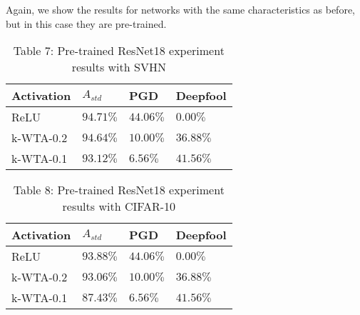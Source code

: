 \documentclass[a4paper]{article}
\begin{document}
	Again, we show the results for networks with the same characteristics as before, but in this case they are pre-trained.
	\begin{table}[!htbp]
		\begin{tabular}{|p{}|p{}|p{}|p{}|}
			\hline
			Activation	& $A_{std}$	&	PGD	&	Deepfool	\\
			\hline
			ReLU		&$94.71\%$&$44.06\%$&$0.00\%$	\\
			\hline
			k-WTA-0.2	&$94.64\%$&$10.00\%$&$36.88\%$	\\
			\hline
			k-WTA-0.1	&$93.12\%$&$6.56\%$&$41.56\%$	\\
			\hline
		\end{tabular}
		\caption{Table 7: Pre-trained ResNet18 experiment results with SVHN}\label{pre-resnetSVHN}
	\end{table}
	\begin{table}[!htbp]
		\begin{tabular}{|p{}|p{}|p{}|p{}|}
			\hline
			Activation	& $A_{std}$	&	PGD	&	Deepfool	\\
			\hline
			ReLU		&$93.88\%$&$44.06\%$&$0.00\%$	\\
			\hline
			k-WTA-0.2	&$93.06\%$&$10.00\%$&$36.88\%$	\\
			\hline
			k-WTA-0.1	&$87.43\%$&$6.56\%$&$41.56\%$	\\
			\hline
		\end{tabular}
		\caption{Table 8: Pre-trained ResNet18 experiment results with CIFAR-10}\label{pre-resnetCIFAR10}
	\end{table}
\end{document}
